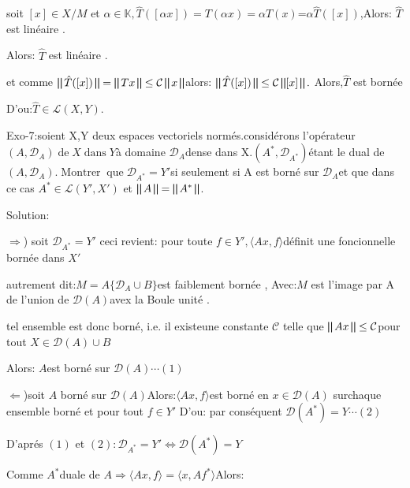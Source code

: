 \documentclass{article}
\begin{document}
soit $[x] \in X / M$ et $\alpha \in \mathbb{K}, \hat{T} ([\alpha x]) = T
(\alpha x) = \alpha T (x)$=$\alpha \hat{T} ([x])$,Alors: $\hat{T}$ est
lin{\'e}aire .

Alors: $\hat{T}$ est lin{\'e}aire .

et comme $\bigparallel \hat{T} ([x]) \bigparallel = \bigparallel T x
\bigparallel \leq \mathcal{C} \bigparallel x \bigparallel$alors: $\bigparallel
\hat{T} ([x]) \bigparallel \leq \mathcal{C} \bigparallel [x] \bigparallel .$
Alors,$\hat{T}$ est born{\'e}e

D'ou:$\hat{T} \in \mathcal{L} (X, Y) .$ 

Exo-7:soient X,Y deux espaces vectoriels norm{\'e}s.consid{\'e}rons
l'op{\'e}rateur $(A, \mathcal{D}_A)
\ensuremath{\operatorname{de}}X\ensuremath{\operatorname{dans}}Y${\`a} domaine
$\mathcal{D}_A$dense dans X.$(A^{\ast}, \mathcal{D}_{A^{\ast}})${\'e}tant le
dual de $(A, \mathcal{D}_A)
.\ensuremath{\operatorname{Montrer}}\ensuremath{\operatorname{que}}\mathcal{D}_{A^{\ast}}
= Y' $si seulement si A est born{\'e} sur $\mathcal{D}_A$et que dans ce cas
$A^{\ast} \in \mathcal{L} {(Y', X') } $ et $\bigparallel A \bigparallel =
\bigparallel A^{\ast} \bigparallel$.

Solution:

$\Rightarrow$) soit $\mathcal{D}_{A^{\ast}} = Y'$ ceci revient: pour toute $f
\in Y', \langle A x, f \rangle$d{\'e}finit une foncionnelle born{\'e}e dans
$X'$

autrement dit:$M = A \{ \mathcal{D}_A \cup B \}$est faiblement born{\'e}e ,
Avec:$M$ est l'image par A de l'union de $\mathcal{D} (A)$avex la Boule
unit{\'e} .

tel ensemble est donc born{\'e}, i.e. il existeune constante $\mathcal{C}$
telle que $\bigparallel A x \bigparallel \leq \mathcal{C}$pour tout $X \in
\mathcal{D} (A) \cup B$

Alors: $A$est born{\'e} sur $\mathcal{D} (A) \cdots (1)$

$\Leftarrow$)soit $A$ born{\'e} sur $\mathcal{D} (A) $Alors:$\langle A x, f
\rangle$est born{\'e} en $x \in \mathcal{D} (A)$ sur\quad chaque ensemble
born{\'e} et pour tout $f \in Y'$ D'ou: par cons{\'e}quent $\mathcal{D}
(A^{\ast}) = Y \cdots (2)$

D'apr{\'e}s $(1)$ et $(2) : \mathcal{D}_{A^{\ast}} = Y' \Leftrightarrow
\mathcal{D} (A^{\ast}) = Y$

Comme $A^{\ast}$duale de $A \Rightarrow \langle A x, f \rangle = \langle x, A
f^{\ast} \rangle $Alors:
\end{document}
